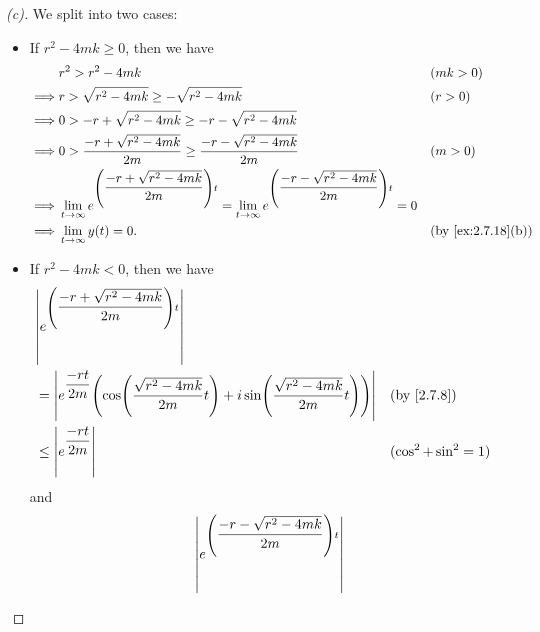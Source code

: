 \begin{proof}[(c)]
  We split into two cases:
  \begin{itemize}
    \item If \(r^2 - 4mk \geq 0\), then we have
          \begin{align*}
                     & r^2 > r^2 - 4mk                                                                                                                         &  & (mk > 0)          \\
            \implies & r > \sqrt{r^2 - 4mk} \geq -\sqrt{r^2 - 4mk}                                                                                             &  & (r > 0)           \\
            \implies & 0 > -r + \sqrt{r^2 - 4mk} \geq -r - \sqrt{r^2 - 4mk}                                                                                                           \\
            \implies & 0 > \dfrac{-r + \sqrt{r^2 - 4mk}}{2m} \geq \dfrac{-r - \sqrt{r^2 - 4mk}}{2m}                                                            &  & (m > 0)           \\
            \implies & \Lim_{t \to \infty} e^{\pa{\dfrac{-r + \sqrt{r^2 - 4mk}}{2m}} t} = \Lim_{t \to \infty} e^{\pa{\dfrac{-r - \sqrt{r^2 - 4mk}}{2m}} t} = 0                        \\
            \implies & \Lim_{t \to \infty} y(t) = 0.                                                                                                           &  & \by{ex:2.7.18}[b]
          \end{align*}
    \item If \(r^2 - 4mk < 0\), then we have
          \begin{align*}
             & \abs{e^{\pa{\dfrac{-r + \sqrt{r^2 - 4mk}}{2m}} t}}                                                                                              \\
             & = \abs{e^{\dfrac{-rt}{2m}} \pa{\cos\pa{\dfrac{\sqrt{r^2 - 4mk}}{2m} t} + i \sin\pa{\dfrac{\sqrt{r^2 - 4mk}}{2m} t}}} &  & \by{2.7.8}            \\
             & \leq \abs{e^{\dfrac{-rt}{2m}}}                                                                                       &  & (\cos^2 + \sin^2 = 1)
          \end{align*}
          and
          \begin{align*}
             & \abs{e^{\pa{\dfrac{-r - \sqrt{r^2 - 4mk}}{2m}} t}}                                                                                                \\

\end{align*}
\end{itemize}
\end{proof}
